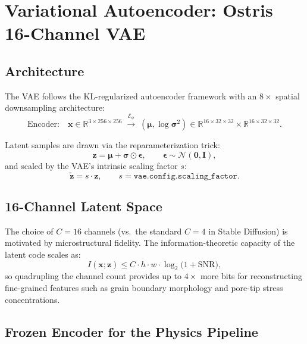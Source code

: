 \documentclass[12pt,a4paper]{article}
\newcommand{\R}{\mathbb{R}}
\newcommand{\N}{\mathcal{N}}
\newcommand{\zvec}{\bm{z}}
\newcommand{\xvec}{\bm{x}}
\theoremstyle{definition}
\begin{document}
\section{Variational Autoencoder: Ostris 16-Channel VAE}
\label{sec:vae}

\subsection{Architecture}

The VAE follows the KL-regularized autoencoder framework
\cite{kingma2014auto} with an $8\times$ spatial downsampling architecture:
\begin{equation}
  \text{Encoder:} \quad \xvec \in \R^{3 \times 256 \times 256}
  \;\xrightarrow{\mathcal{E}_\phi}\;
  (\bm{\mu}, \log\bm{\sigma}^2) \in \R^{16 \times 32 \times 32} \times \R^{16 \times 32 \times 32}.
\end{equation}

Latent samples are drawn via the reparameterization trick:
\begin{equation}
  \zvec = \bm{\mu} + \bm{\sigma} \odot \bm{\epsilon},
  \qquad \bm{\epsilon} \sim \N(\bm{0}, \bm{I}),
  \label{eq:reparam}
\end{equation}
and scaled by the VAE's intrinsic scaling factor $s$:
\begin{equation}
  \tilde{\zvec} = s \cdot \zvec,
  \qquad s = \texttt{vae.config.scaling\_factor}.
  \label{eq:latent_scaling}
\end{equation}

\subsection{16-Channel Latent Space}

The choice of $C=16$ channels (vs.\ the standard $C=4$ in Stable Diffusion)
is motivated by microstructural fidelity.  The information-theoretic capacity
of the latent code scales as:
\begin{equation}
  I(\xvec; \zvec) \leq C \cdot h \cdot w \cdot \log_2\!\bigl(1 + \mathrm{SNR}\bigr),
\end{equation}
so quadrupling the channel count provides up to $4\times$ more bits for
reconstructing fine-grained features such as grain boundary morphology and
pore-tip stress concentrations.

\subsection{Frozen Encoder for the Physics Pipeline}
\end{document}
